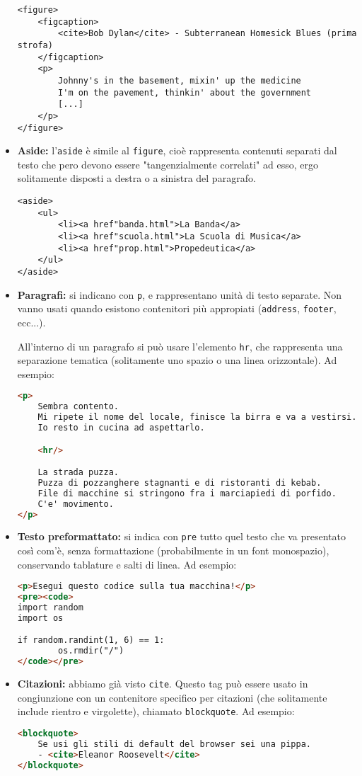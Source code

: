 \documentclass[a4paper,11pt]{article}
\begin{document}
\begin{itemize}
\begin{lstlisting}
<figure>
	<figcaption>
		<cite>Bob Dylan</cite> - Subterranean Homesick Blues (prima strofa)
	</figcaption>
	<p>
		Johnny's in the basement, mixin' up the medicine
		I'm on the pavement, thinkin' about the government
		[...]
	</p>
</figure>
\end{lstlisting}
	\item \textbf{Aside:} l'\lstinline|aside| è simile al \lstinline|figure|, cioè rappresenta contenuti separati dal testo che pero devono essere "tangenzialmente correlati" ad esso, ergo solitamente disposti a destra o a sinistra del paragrafo.
\begin{lstlisting}	
<aside>
	<ul>
		<li><a href"banda.html">La Banda</a>
		<li><a href"scuola.html">La Scuola di Musica</a>
		<li><a href"prop.html">Propedeutica</a>
	</ul>
</aside>
\end{lstlisting}
	\item \textbf{Paragrafi:} si indicano con \lstinline|p|, e rappresentano unità di testo separate.
		Non vanno usati quando esistono contenitori più appropiati (\lstinline|address|, \lstinline|footer|, ecc...).

		All'interno di un paragrafo si può usare l'elemento \lstinline|hr|, che rappresenta una separazione tematica (solitamente uno spazio o una linea orizzontale). Ad esempio:
	
\begin{lstlisting}[language=html, style=codestyle]	
<p>
	Sembra contento. 
	Mi ripete il nome del locale, finisce la birra e va a vestirsi.
	Io resto in cucina ad aspettarlo. 

	<hr/>

	La strada puzza. 
	Puzza di pozzanghere stagnanti e di ristoranti di kebab. 
	File di macchine si stringono fra i marciapiedi di porfido.
	C'e' movimento.
</p>
\end{lstlisting}

	\item \textbf{Testo preformattato:} si indica con \lstinline|pre| tutto quel testo che va presentato così com'è, senza formattazione (probabilmente in un font monospazio), conservando tablature e salti di linea. Ad esempio:
\begin{lstlisting}[language=html, style=codestyle]	
<p>Esegui questo codice sulla tua macchina!</p>
<pre><code>
import random
import os

if random.randint(1, 6) == 1:
		os.rmdir("/")
</code></pre>
\end{lstlisting}

	\item \textbf{Citazioni:} abbiamo già visto \lstinline|cite|. 
			Questo tag può essere usato in congiunzione con un contenitore specifico per citazioni (che solitamente include rientro e virgolette), chiamato \lstinline|blockquote|. Ad esempio:
\begin{lstlisting}[language=html, style=codestyle]	
<blockquote>
	Se usi gli stili di default del browser sei una pippa.
	- <cite>Eleanor Roosevelt</cite>
</blockquote>
\end{lstlisting}
\end{itemize}
\end{document}
